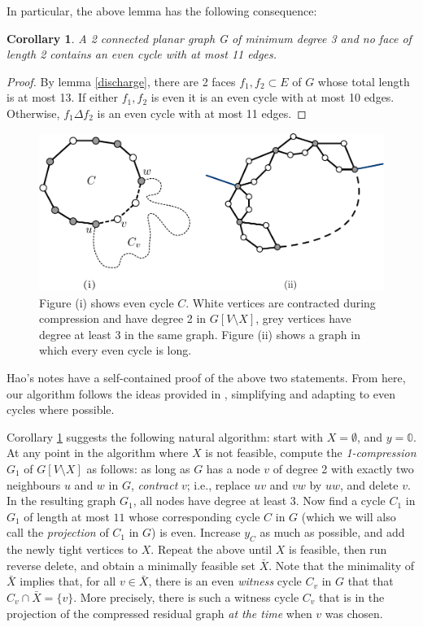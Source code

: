 \documentclass{article}
\newcommand{\0}{\mathbb{0}}
\newcommand{\1}{\mathbb{1}}
\newtheorem{cor}[theorem]{Corollary}
\begin{document}
In particular, the above lemma has the following consequence:

\begin{cor}\label{cor:smallec}
  A 2 connected planar graph G of minimum degree 3 and no face of
  length 2 contains an even cycle with at most 11 edges.
\end{cor}
\begin{proof}
By lemma \ref{discharge}, there are 2 faces $f_1,f_2 \subset E$ of $G$ whose total length is at most 13. If either $f_1,f_2$ is even it is an even cycle with at most 10 edges. Otherwise,  $f_1 \Delta f_2$ is an even cycle with at most 11 edges.
\end{proof}


\begin{figure}
  \begin{center}
    \includegraphics[width=.9\textwidth]{simple-pd.pdf}
  \end{center}
  \caption{\label{fig:simplepd} Figure (i) shows even cycle
    $C$. White vertices are contracted during compression and have
    degree 2 in $G[V\setminus X]$, grey vertices have degree at least
    3 in the same graph. Figure (ii) shows a graph in which every even cycle is long. }
\end{figure}

Hao's notes have a self-contained proof of the above two statements.
From here, our algorithm follows the ideas provided in \cite{FJP10},
simplifying and adapting to even cycles where possible. 

Corollary \ref{cor:smallec} suggests the following natural algorithm:
start with $X=\emptyset$, and $y=\0$. At any point in the algorithm
where $X$ is not feasible, compute the {\em 1-compression} $G_1$ of
$G[V\setminus X]$ as follows: as long as $G$ has a node $v$ of degree 2 with
exactly two neighbours $u$ and $w$ in $G$, {\em contract} $v$; i.e.,
replace $uv$ and $vw$ by $uw$, and delete $v$. In the resulting graph
$G_1$, all nodes have degree at least $3$. Now find a cycle $C_1$ in
$G_1$ of length at most $11$ whose corresponding cycle $C$ in $G$
(which we will also call the {\em projection} of $C_1$ in $G$)
is
even. Increase $y_C$ as much as possible, and add the newly tight
vertices to $X$. Repeat the above until $X$ is feasible, then run
reverse delete, and obtain a minimally feasible set $\bar{X}$. Note
that the minimality of $\bar{X}$ implies that, for all
$v \in \bar{X}$, there is an even {\em witness} cycle $C_v$ in $G$
that that $C_v \cap \bar{X} = \{v\}$. More precisely,  there is such a
witness cycle $C_v$ that is in the projection of  the compressed
residual graph {\em at the time} when $v$ was chosen. 
\end{document}
